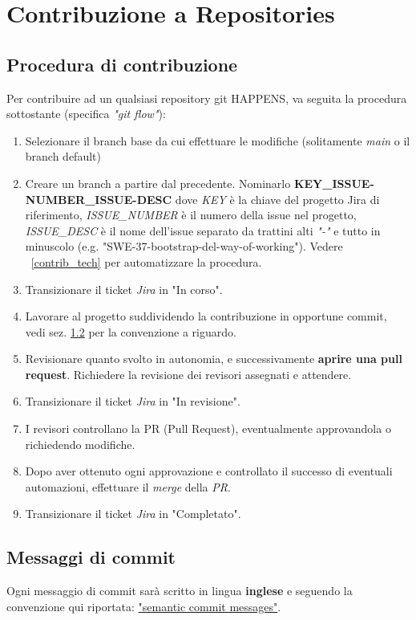 
\section{Contribuzione a Repositories}

\subsection{Procedura di contribuzione}\label{mainsec:contrib}
Per contribuire ad un qualsiasi repository git HAPPENS, va seguita la procedura sottostante (specifica \textit{"git flow"}):
\begin{enumerate}
    \item Selezionare il branch base da cui effettuare le modifiche (solitamente \textit{main} o il branch default)
    \item Creare un branch a partire dal precedente. Nominarlo \textbf{KEY\_ISSUE-NUMBER\_ISSUE-DESC} dove
          \textit{KEY} è la chiave del progetto Jira di riferimento, \textit{ISSUE\_NUMBER} è il numero della issue nel
          progetto, \textit{ISSUE\_DESC} è il nome dell'issue separato da trattini alti \textit{"-"} e tutto in minuscolo (e.g. "SWE-37-bootstrap-del-way-of-working"). Vedere ~\ref{contrib_tech} per automatizzare la procedura.
    \item Transizionare il ticket \textit{Jira} in "In corso".
    \item Lavorare al progetto suddividendo la contribuzione in opportune commit, vedi sez. \ref{contrib_sem_commit_scopes} per la convenzione a riguardo.
    \item Revisionare quanto svolto in autonomia, e successivamente \textbf{aprire una pull request}. Richiedere la revisione dei revisori assegnati e attendere.
    \item Transizionare il ticket \textit{Jira} in "In revisione".
    \item I revisori controllano la PR (Pull Request), eventualmente approvandola o richiedendo modifiche.
    \item Dopo aver ottenuto ogni approvazione e controllato il successo di eventuali automazioni, effettuare il \textit{merge} della \textit{PR}.
    \item Transizionare il ticket \textit{Jira} in "Completato".
\end{enumerate}

\subsection{Messaggi di commit}\label{contrib_sem_commit_scopes}
Ogni messaggio di commit sarà scritto in lingua \textbf{inglese} e seguendo la convenzione qui riportata: \href{https://gist.github.com/joshbuchea/6f47e86d2510bce28f8e7f42ae84c716}{"semantic commit messages"}.

